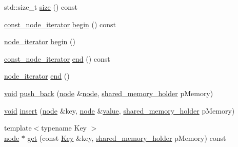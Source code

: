 \begin{DoxyCompactItemize}
\item 
std\+::size\+\_\+t \mbox{\hyperlink{class_y_a_m_l_1_1detail_1_1node__ref_ab859942cf41db4c0e4892d615b2903fe}{size}} () const
\item 
\mbox{\hyperlink{namespace_y_a_m_l_1_1detail_a049af8e269401cbe1e735033914e4356}{const\+\_\+node\+\_\+iterator}} \mbox{\hyperlink{class_y_a_m_l_1_1detail_1_1node__ref_a36c081e7a440b8dbbd532da0cfdc426d}{begin}} () const
\item 
\mbox{\hyperlink{namespace_y_a_m_l_1_1detail_aa2a961156810d41a3b6744c10186afac}{node\+\_\+iterator}} \mbox{\hyperlink{class_y_a_m_l_1_1detail_1_1node__ref_a2bd904440f55614473fa2c2591669453}{begin}} ()
\item 
\mbox{\hyperlink{namespace_y_a_m_l_1_1detail_a049af8e269401cbe1e735033914e4356}{const\+\_\+node\+\_\+iterator}} \mbox{\hyperlink{class_y_a_m_l_1_1detail_1_1node__ref_a9e9b30c734ef04339eace18f7791ca4f}{end}} () const
\item 
\mbox{\hyperlink{namespace_y_a_m_l_1_1detail_aa2a961156810d41a3b6744c10186afac}{node\+\_\+iterator}} \mbox{\hyperlink{class_y_a_m_l_1_1detail_1_1node__ref_ae0e43a1e8678e46549cc2624f9ce5557}{end}} ()
\item 
\mbox{\hyperlink{glad_8h_a950fc91edb4504f62f1c577bf4727c29}{void}} \mbox{\hyperlink{class_y_a_m_l_1_1detail_1_1node__ref_a0b6cf1208301571efc2a28726a9f2215}{push\+\_\+back}} (\mbox{\hyperlink{class_y_a_m_l_1_1detail_1_1node}{node}} \&\mbox{\hyperlink{class_y_a_m_l_1_1detail_1_1node}{node}}, \mbox{\hyperlink{namespace_y_a_m_l_1_1detail_a228c4b3b6ba1058b474d40afc218e21d}{shared\+\_\+memory\+\_\+holder}} p\+Memory)
\item 
\mbox{\hyperlink{glad_8h_a950fc91edb4504f62f1c577bf4727c29}{void}} \mbox{\hyperlink{class_y_a_m_l_1_1detail_1_1node__ref_a0925bb1842e980b6fc17ff0c3e654251}{insert}} (\mbox{\hyperlink{class_y_a_m_l_1_1detail_1_1node}{node}} \&key, \mbox{\hyperlink{class_y_a_m_l_1_1detail_1_1node}{node}} \&\mbox{\hyperlink{glad_8h_a03aff08f73d7fde3d1a08e0abd8e84fa}{value}}, \mbox{\hyperlink{namespace_y_a_m_l_1_1detail_a228c4b3b6ba1058b474d40afc218e21d}{shared\+\_\+memory\+\_\+holder}} p\+Memory)
\item 
{\footnotesize template$<$typename Key $>$ }\\\mbox{\hyperlink{class_y_a_m_l_1_1detail_1_1node}{node}} $\ast$ \mbox{\hyperlink{class_y_a_m_l_1_1detail_1_1node__ref_acbb383d775d42821437e0c2e2c68cfec}{get}} (const \mbox{\hyperlink{namespace_y_a_m_l_a67c320aa50d3de7ecba1d0b8775dd684a1af533fc24b0311b8c4d5ac2870283aa}{Key}} \&key, \mbox{\hyperlink{namespace_y_a_m_l_1_1detail_a228c4b3b6ba1058b474d40afc218e21d}{shared\+\_\+memory\+\_\+holder}} p\+Memory) const

\end{DoxyCompactItemize}
